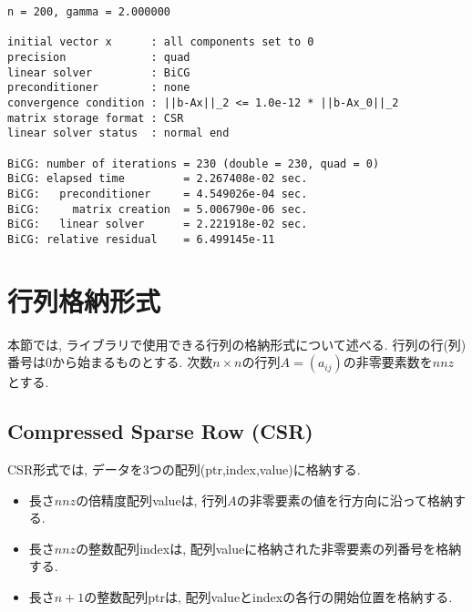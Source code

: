 \documentclass[a4paper]{jarticle}
\begin{document}
{{\begin{verbatim}
n = 200, gamma = 2.000000

initial vector x      : all components set to 0
precision             : quad
linear solver         : BiCG
preconditioner        : none
convergence condition : ||b-Ax||_2 <= 1.0e-12 * ||b-Ax_0||_2
matrix storage format : CSR
linear solver status  : normal end

BiCG: number of iterations = 230 (double = 230, quad = 0)
BiCG: elapsed time         = 2.267408e-02 sec.
BiCG:   preconditioner     = 4.549026e-04 sec.
BiCG:     matrix creation  = 5.006790e-06 sec.
BiCG:   linear solver      = 2.221918e-02 sec.
BiCG: relative residual    = 6.499145e-11
\end{verbatim}

\newpage
\section{行列格納形式}
\label{sec:storages}
本節では, ライブラリで使用できる行列の格納形式について述べる. 
行列の行(列)番号は0から始まるものとする. 
次数$n \times n$の行列$A=(a_{ij})$の非零要素数を$nnz$とする. 

\subsection{Compressed Sparse Row (CSR)}
CSR形式では, データを3つの配列({\ttfamily ptr,index,value})に格納する. 
\begin{itemize}
\item 長さ$nnz$の倍精度配列{\ttfamily value}は, 行列$A$の非零要素の値を行方向に沿って格納する. 
\item 長さ$nnz$の整数配列{\ttfamily index}は, 配列{\ttfamily value}に格納された非零要素の列番号を格納する. 
\item 長さ$n+1$の整数配列{\ttfamily ptr}は, 配列{\ttfamily value}と{\ttfamily index}の各行の開始位置を格納する. 
\end{itemize}

}}
\end{document}
